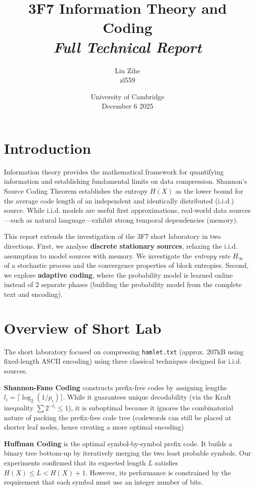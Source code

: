 \documentclass[11pt,a4paper]{article}
\title{3F7 Information Theory and Coding \\ \textit{Full Technical Report}}
\author{Liu Zihe \\ zl559}
\date{University of Cambridge \\ December 6 2025}
\theoremstyle{definition} %
\newcommand{\Hrate}{H_\infty}
\begin{document}
\maketitle

\section{Introduction}

Information theory provides the mathematical framework for quantifying information and establishing fundamental limits on data compression. Shannon's Source Coding Theorem establishes the entropy $H(X)$ as the lower bound for the average code length of an independent and identically distributed (i.i.d.) source. While i.i.d. models are useful first approximations, real-world data sources---such as natural language---exhibit strong temporal dependencies (memory).

This report extends the investigation of the 3F7 short laboratory in two directions. First, we analyse \textbf{discrete stationary sources}, relaxing the i.i.d. assumption to model sources with memory. We investigate the \textit{entropy rate} $\Hrate$ of a stochastic process and the convergence properties of block entropies. Second, we explore \textbf{adaptive coding}, where the probability model is learned online instead of 2 separate phases (building the probability model from the complete text and encoding).

\section{Overview of Short Lab}

The short laboratory focused on compressing \texttt{hamlet.txt} (approx. 207kB using fixed-length ASCII encoding) using three classical techniques designed for i.i.d. sources.

\textbf{Shannon-Fano Coding} constructs prefix-free codes by assigning lengths $l_i = \lceil \log_2(1/p_i) \rceil$. While it guarantees unique decodability (via the Kraft inequality $\sum 2^{-l_i} \le 1$), it is suboptimal because it ignores the combinatorial nature of packing the prefix-free code tree (codewords can still be placed at shorter leaf nodes, hence creating a more optimal encoding)

\textbf{Huffman Coding} is the optimal symbol-by-symbol prefix code. It builds a binary tree bottom-up by iteratively merging the two least probable symbols. Our experiments confirmed that its expected length $L$ satisfies $H(X) \le L < H(X) + 1$. However, its performance is constrained by the requirement that each symbol must use an integer number of bits.
\end{document}
